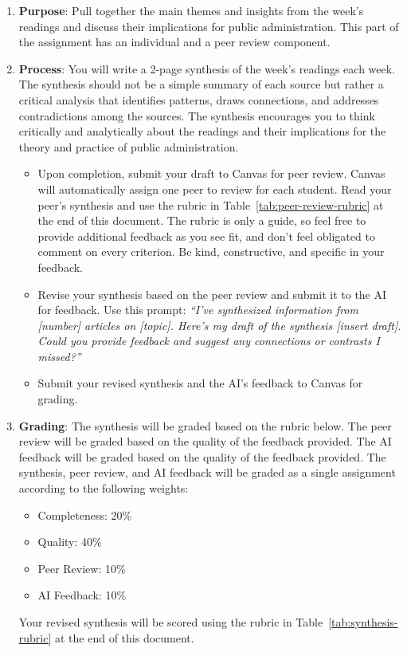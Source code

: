 \documentclass[12pt, letterpaper]{article}
\begin{document}
\begin{enumerate}
    \item \textbf{Purpose}: Pull together the main themes and insights from the week’s readings and discuss their implications for public administration. This part of the assignment has an individual and a peer review component.
    \item \textbf{Process}: You will write a 2-page synthesis of the week's readings each week. The synthesis should not be a simple summary of each source but rather a critical analysis that identifies patterns, draws connections, and addresses contradictions among the sources. The synthesis encourages you to think critically and analytically about the readings and their implications for the theory and practice of public administration.
        \begin{itemize}
            \item Upon completion, submit your draft to Canvas for peer review. Canvas will automatically assign one peer to review for each student. Read your peer's synthesis and use the rubric in Table~\ref{tab:peer-review-rubric} at the end of this document. The rubric is only a guide, so feel free to provide additional feedback as you see fit, and don't feel obligated to comment on every criterion. Be kind, constructive, and specific in your feedback. 
            \item Revise your synthesis based on the peer review and submit it to the AI for feedback. Use this prompt:  \textit{“I’ve synthesized information from [number] articles on [topic]. Here’s my draft of the synthesis [insert draft]. Could you provide feedback and suggest any connections or contrasts I missed?”}
            \item Submit your revised synthesis and the AI's feedback to Canvas for grading.
        \end{itemize}
    \item \textbf{Grading}: The synthesis will be graded based on the rubric below. The peer review will be graded based on the quality of the feedback provided. The AI feedback will be graded based on the quality of the feedback provided. The synthesis, peer review, and AI feedback will be graded as a single assignment according to the following weights:
        \begin{itemize}
            \item Completeness: 20\%
            \item Quality: 40\%
            \item Peer Review: 10\%
            \item AI Feedback: 10\%
        \end{itemize}
    Your revised synthesis will be scored using the rubric in Table~\ref{tab:synthesis-rubric} at the end of this document. 
\end{enumerate}
\end{document}
